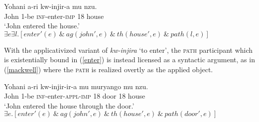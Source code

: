 \documentclass[output=paper]{langsci/langscibook}
\begin{document}
\begin{exe}
      \ex\label{enter}\begin{xlist}
	      \ex\gll Yohani a-ri kw-injir-a mu nzu.\\
			      John 1{\sc-be} {\scshape inf-}enter-{\scshape imp} 18 house\\
			      \glt `John entered the house.'
	      \ex $\exists e\exists l.[enter'(e) \ \&\ ag(john', e)  \ \&\ th(house', e)  \ \&\ path(l,e)]$
	      \end{xlist}
	      \end{exe}
With the applicativized variant of  \emph{kw-injira} `to enter', the {\scshape path}  participant which is existentially bound in (\ref{enter}) is  instead licensed as a syntactic argument, as in (\ref{mackwell}) where  the {\scshape path}  is realized overtly as the applied object.
      \begin{exe}
      \ex\label{mackwell}\begin{xlist}
	      \ex\gll Yohani a-ri kw-injir-ir-a mu muryango mu nzu.\\
			      John 1{\sc-be} {\scshape inf-}enter-{\scshape appl-imp} 18 door 18 house\\
			      \glt `John entered the house through the door.'
	\ex $\exists e.[enter'(e) \ \&\ ag(john', e)  \ \&\ th(house', e)  \ \&\ path(door', e) ]$
      \end{xlist}
\end{exe}
%

\end{document}
